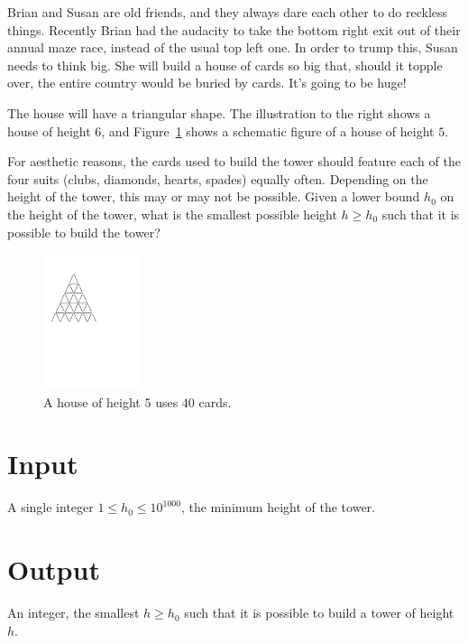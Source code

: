 
%
Brian and Susan are old friends, and they always dare each other to do
reckless things.  Recently Brian had the audacity to take the bottom
right exit out of their annual maze race, instead of the usual top
left one.  In order to trump this, Susan needs to think big.  She will
build a house of cards so big that, should it topple over, the entire
country would be buried by cards.  It's going to be huge!

The house will have a triangular shape.  The illustration to the right
shows a house of height $6$, and Figure~\ref{fig:house of cards} shows a schematic figure of a house of height $5$.

For aesthetic reasons, the cards used to build the tower should
feature each of the four suits (clubs, diamonds, hearts, spades)
equally often.  Depending on the height of the tower, this may or may
not be possible.  Given a lower bound $h_0$ on the height of the
tower, what is the smallest possible height $h \ge h_0$ such that it
is possible to build the tower?
\begin{figure}[h]
\centering
\includegraphics[width=0.25\textwidth]{fig}
\caption{A house of height $5$ uses $40$ cards.}
\label{fig:house of cards}
\end{figure}

\section*{Input}

A single integer $1 \le h_0 \le 10^{1000}$, the minimum height of the tower.

\section*{Output}

An integer, the smallest $h \ge h_0$ such that it is possible to build a tower of height $h$.
